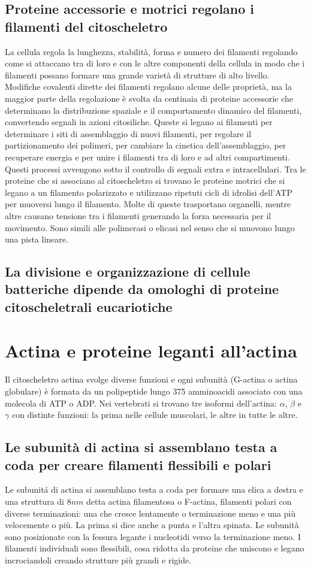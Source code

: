 \subsection{Proteine accessorie e motrici regolano i filamenti del citoscheletro}
La cellula regola la lunghezza, stabilit\`a, forma e numero dei filamenti regolando come si attaccano tra di loro e con le altre componenti della cellula in modo che i filamenti possano
formare una grande variet\`a di strutture di alto livello. Modifiche covalenti dirette dei filamenti regolano alcune delle propriet\`a, ma la maggior parte della regolazione \`e svolta
da centinaia di proteine accessorie che determinano la distribuzione spaziale e il comportamento dinamico del filamenti, convertendo segnali in azioni citosiliche. Queste si legano ai
filamenti per determinare i siti di assemblaggio di nuovi filamenti, per regolare il partizionamento dei polimeri, per cambiare la cinetica dell'assemblaggio, per recuperare energia e 
per unire i filamenti tra di loro e ad altri compartimenti. Questi processi avvengono sotto il controllo di segnali extra e intracellulari. Tra le proteine che si associano al 
citoscheletro si trovano le proteine motrici che si legano a un filamento polarizzato e utilizzano ripetuti cicli di idrolisi dell'ATP per muoversi lungo il filamento. Molte di queste
trasportano organelli, mentre altre causano tensione tra i filamenti generando la forza necessaria per il movimento. Sono simili alle polimerasi o elicasi nel senso che si muovono lungo
una pista lineare. 
\subsection{La divisione e organizzazione di cellule batteriche dipende da omologhi di proteine citoscheletrali eucariotiche}
\section{Actina e proteine leganti all'actina}
Il citoscheletro actina svolge diverse funzioni e ogni subunit\`a (G-actina o actina globulare) \`e formata da un polipeptide lungo 375 amminoacidi associato con una molecola di ATP o 
ADP. Nei vertebrati si trovano tre isoformi dell'actina: $\alpha$, $\beta$ e $\gamma$ con distinte funzioni: la prima nelle cellule muscolari, le altre in tutte le altre.
\subsection{Le subunit\`a di actina si assemblano testa a coda per creare filamenti flessibili e polari}
Le subunit\'a di actina si assemblano testa a coda per formare una elica a destra e una struttura di $8 nm$ detta actina filamentosa o F-actina, filamenti polari con diverse 
terminazioni: una che cresce lentamente o terminazione meno e una pi\`u velocemente o pi\`u. La prima si dice anche a punta e l'altra spinata. Le subunit\`a sono posizionate con la 
fessura legante i nucleotidi verso la terminazione meno. I filamenti individuali sono flessibili, cosa ridotta da proteine che uniscono e legano incrociandoli creando strutture pi\`u
grandi e rigide.
